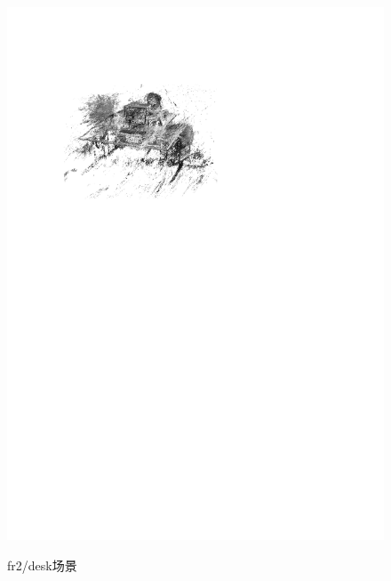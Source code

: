 \begin{figure}[h]
{          \includegraphics[scale=0.7]{figures/Fig4-4_b.pdf}
          }
     \caption{fr2/desk场景}
\label{fig4.4}
\end{figure}

